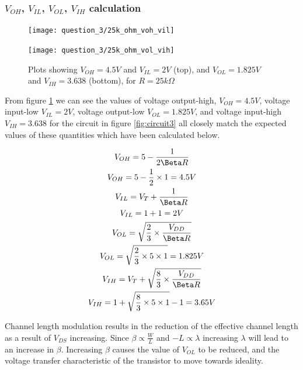 \documentclass[11pt, a4paper]{article}
\begin{document}
\FloatBarrier
\subsubsection{$V_{OH}$, $V_{IL}$, $V_{OL}$, $V_{IH}$ calculation}

\begin{figure}
  \centering
  \begin{minipage}{0.7\textwidth}
      \centering
      \texttt{[image: question\_3/25k\_ohm\_voh\_vil]} %
  \end{minipage}\vfill
  \begin{minipage}{0.7\textwidth}
      \centering
      \texttt{[image: question\_3/25k\_ohm\_vol\_vih]} %
  \end{minipage}
  \caption{\centering Plots showing $V_{OH} = 4.5V$ and $V_{IL} = 2V$ (top), and $V_{OL} = 1.825V$ and
   $V_{IH} = 3.638$ (bottom), for $R = 25k\Omega$}  
   \label{fig:8}
\end{figure}

From figure \ref{fig:8} we can see the values of voltage output-high, $V_{OH} = 4.5V$, voltage input-low $V_{IL} = 2V$, voltage output-low $V_{OL} = 1.825V$, and voltage input-high $V_{IH} = 3.638$ for the circuit in figure \ref{fig:circuit3} all closely match the expected values of these quantities which have been calculated below.



    

\begin{gather}    
V_{OH} = 5 - \frac{1}{2\Beta R}\label{eq:2.1.2.1}\\
V_{OH} = 5 - \frac{1}{2} \times 1 = 4.5V\\
V_{IL} = V_T + \frac{1}{\Beta R}\label{eq:2.1.2.2}\\
V_{IL} = 1 + 1 = 2V \\
V_{OL} = \sqrt{\frac{2}{3} \times \frac{V_{DD}}{\Beta R}}\label{eq:2.1.2.3}\\
V_{OL} = \sqrt{\frac{2}{3} \times 5 \times 1} = 1.825V\\
V_{IH} = V_T + \sqrt{\frac{8}{3} \times \frac{V_{DD}}{\Beta R}}\label{eq:test}\label{eq:2.1.2.4}\\
V_{IH} = 1 + \sqrt{\frac{8}{3} \times 5 \times 1} - 1 = 3.65V
\end{gather}

Channel length modulation results in the reduction of the effective channel length as a result of $V_{DS}$ increasing. 
Since $\beta \propto \frac{W}{L}$ and $-L \propto \lambda$ increasing $\lambda$ will lead to an increase in $\beta$. Increasing $\beta$ causes the value of $V_{OL}$ to be reduced, and the voltage transfer characteristic of the transistor to move towards ideality.
\end{document}

